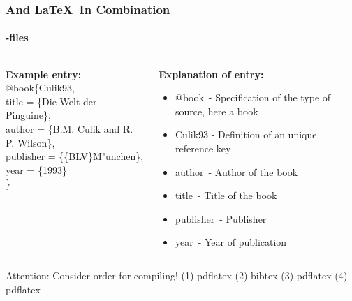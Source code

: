 \begin{frame}
\frametitle{\BibTeX And \LaTeX ~In Combination}
\framesubtitle{\BibTeX -files}
\begin{columns}
\begin{column}{0.52\textwidth}
\textbf{Example entry:}\\[1em]

\color{nounibaredI}$@$book\color{black}\{Culik93,\\
\color{nounibaredI}title\color{black} = \{Die Welt der Pinguine\},\\
\color{nounibaredI}author\color{black} = \{B.M. Culik and R. P. Wilson\},\\
\color{nounibaredI}publisher\color{black} = \{\{BLV\}M"unchen\},\\
\color{nounibaredI}year\color{black} = \{1993\}\\
\}
\end{column}
\begin{column}{0.55\textwidth}
\textbf{Explanation of entry:}
\begin{itemize}
\item \color{nounibaredI}$@$book\color{black}~- Specification of the type of source, here a book
\item Culik93 - Definition of an unique reference key
\item \color{nounibaredI}author\color{black}~- Author of the book
\item \color{nounibaredI}title\color{black}~- Title of the book
\item \color{nounibaredI}publisher\color{black}~- Publisher
\item \color{nounibaredI}year\color{black}~- Year of publication
\end{itemize}
\end{column}
\end{columns}
\begin{alertblock}{Attention: Consider order for compiling!}
(1) pdflatex (2) bibtex (3) pdflatex (4) pdflatex
\end{alertblock}
\end{frame}

